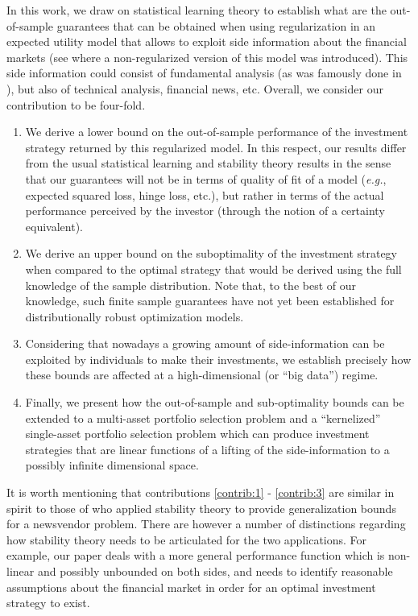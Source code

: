 \documentclass[]{interact}
\theoremstyle{plain}%
\theoremstyle{definition}
\theoremstyle{remark}
\newcommand{\eg}{\textit{e.g.}}
\newcommand{\0}{\V{0}}
\newcommand{\1}{\V{1}}
\newcommand{\modified}[1]{{\color{blue} #1}}
\theoremstyle{plain}
\theoremstyle{definition}
\begin{document}
In this work, we draw on statistical learning theory to establish what are the
out-of-sample guarantees that can be obtained when using regularization in an expected
utility model that allows to exploit side information about the financial markets (see
\cite{brandt2009parametric} where a non-regularized version of this model was introduced).  This side
information could consist of fundamental analysis (as was famously done in
\cite{fama1993common}), but also of technical analysis, financial news, etc. Overall,
we consider our contribution to be four-fold.
\begin{enumerate}
\item\label{contrib:1} We derive a lower bound on the out-of-sample performance of the investment strategy
  returned by this regularized model.  In this respect, our results differ from the usual
  statistical learning and stability theory results in the sense that our guarantees will
  not be in terms of quality of fit of a model (\eg, expected squared loss, hinge loss,
  etc.), but rather in terms of the actual performance perceived by the investor (through
  the notion of a certainty equivalent).
\item\label{contrib:2} We derive an upper bound on the suboptimality of the investment strategy when
  compared to the optimal strategy that would be derived using the full knowledge of the
  sample distribution. Note that, \modified{to the best of our knowledge}, such finite sample guarantees have not yet been established for distributionally robust optimization models.
\item\label{contrib:3} Considering that nowadays a growing amount of side-information can be exploited by
  individuals to make their investments, we establish precisely how these bounds are
  affected at a high-dimensional (or ``big data'') regime.
  \item\label{contrib:4} Finally, we present how the out-of-sample and sub-optimality bounds can be extended to a multi-asset portfolio selection problem and a ``kernelized'' single-asset portfolio selection problem which can produce investment strategies that are linear functions of a lifting of the side-information to a possibly infinite dimensional space.
\end{enumerate}
It is worth mentioning that contributions \ref{contrib:1} - \ref{contrib:3} are similar in spirit to those of \cite{rudin2015big} who applied stability theory to provide generalization bounds for a newsvendor problem. There are however a number of distinctions regarding how stability theory needs to be articulated for the two applications. For example, our paper deals with a more general performance function which is non-linear and possibly unbounded on both sides, and needs to identify reasonable assumptions about the financial market in order for an optimal investment strategy to exist. 
\end{document}
